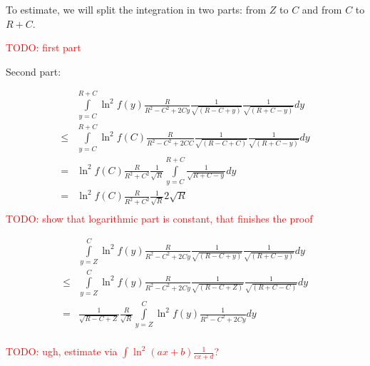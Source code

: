 \documentclass[12pt, a4paper]{article}
\newcommand{\todo}[1]{{\large \textcolor{red}{TODO: #1}}}
\begin{document}
To estimate, we will split the integration in two parts: from $Z$ to $C$ and from $C$ to $R + C$.

\todo{first part}

Second part:

\begin{align*}
    & \int\limits_{y = C}^{R + C} \ln^2 f(y) \frac{R}{R^2 - C^2 + 2 C y} \frac{1}{\sqrt{(R - C + y)}} \frac{1}{\sqrt{(R + C - y)}} dy\\
\le & \int\limits_{y = C}^{R + C} \ln^2 f(C) \frac{R}{R^2 - C^2 + 2 C C} \frac{1}{\sqrt{(R - C + C)}} \frac{1}{\sqrt{(R + C - y)}} dy\\
=   & \ln^2 f(C) \frac{R}{R^2 + C^2} \frac{1}{\sqrt{R}} \int\limits_{y = C}^{R + C} \frac{1}{\sqrt{R + C - y}} dy\\
=   & \ln^2 f(C) \frac{R}{R^2 + C^2} \frac{1}{\sqrt{R}} 2 \sqrt{R}\\
\end{align*}
\todo{show that logarithmic part is constant, that finishes the proof}

\begin{align*} 
    & \int\limits_{y = Z}^{C} \ln^2 f(y) \frac{R}{R^2 - C^2 + 2 C y} \frac{1}{\sqrt{(R - C + y)}} \frac{1}{\sqrt{(R + C - y)}} dy\\
\le & \int\limits_{y = Z}^{C} \ln^2 f(y) \frac{R}{R^2 - C^2 + 2 C y} \frac{1}{\sqrt{(R - C + Z)}} \frac{1}{\sqrt{(R + C - C)}} dy\\
=   & \frac{1}{\sqrt{R - C + Z}} \frac{R}{\sqrt{R}}  \int\limits_{y = Z}^{C} \ln^2 f(y) \frac{1}{R^2 - C^2 + 2 C y} dy\\
\end{align*}

\todo{ugh, estimate via $\int \ln^2(a x + b) \frac{1}{c x + d}$? }
\end{document}
